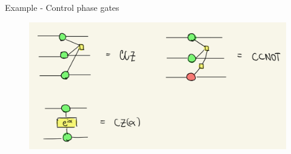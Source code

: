 \documentclass[aspectratio=169,xcolor=dvipsnames, t]{beamer}
\begin{document}
\begin{frame}{Example - Control phase gates}
    \begin{figure}
        \centering 
        \includegraphics[width=.85\textwidth]{figures/zx_control_phases.PNG}
    \end{figure}
\end{frame}



\end{document}
